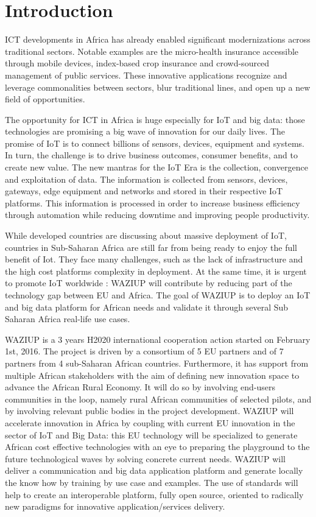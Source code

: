 
\section{Introduction}

ICT developments in Africa has already enabled significant modernizations across traditional sectors.
Notable examples are the micro-health insurance accessible through mobile devices, index-based crop insurance and crowd-sourced management of public services.
These innovative applications recognize and leverage commonalities between sectors, blur traditional lines, and open up a new field of opportunities.

The opportunity for ICT in Africa is huge especially for IoT and big data: those technologies are promising a big wave of innovation for our daily lives.
The promise of IoT is to connect billions of sensors, devices, equipment and systems.
In turn, the challenge is to drive business outcomes, consumer benefits, and to create new value.
The new mantras for the IoT Era is the collection, convergence and exploitation of data.
The information is collected from sensors, devices, gateways, edge equipment and networks and stored in their respective IoT platforms.
This information is processed in order to increase business efficiency through automation while reducing downtime and improving people productivity.

While developed countries are discussing about massive deployment of IoT, countries in Sub-Saharan Africa are still far from being ready to enjoy the full benefit of Iot.
They face many challenges, such as the lack of infrastructure and the high cost platforms complexity in deployment.
At the same time, it is urgent to promote IoT worldwide : WAZIUP will contribute by reducing part of the technology gap between EU and Africa.
The goal of WAZIUP is to deploy an IoT and big data platform for African needs and validate it through several Sub Saharan Africa real-life use cases.

WAZIUP is a 3 years H2020 international cooperation action started on February 1st, 2016.
The project is driven by a consortium of 5 EU partners and of 7 partners from 4 sub-Saharan African countries.
Furthermore, it has support from multiple African stakeholders with the aim of defining new innovation space to advance the African Rural Economy.
It will do so by involving end-users communities in the loop, namely rural African communities of selected pilots, and by involving relevant public bodies in the project development.
WAZIUP will accelerate innovation in Africa by coupling with current EU innovation in the sector of IoT and Big Data: this EU technology will be specialized to generate African cost effective technologies with an eye to preparing the playground to the future technological waves by solving concrete current needs.
WAZIUP will deliver a communication and big data application platform and generate locally the know how by training by use case and examples.
The use of standards will help to create an interoperable platform, fully open source, oriented to radically new paradigms for innovative application/services delivery.

